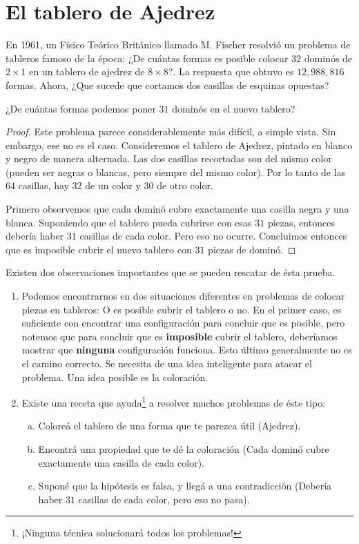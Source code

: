 \section{El tablero de Ajedrez}

En 1961, un F\'isico Te\'orico Brit\'anico llamado M. Fischer resolvi\'o un problema de tableros famoso de la \'epoca: ¿De cu\'antas formas es posible colocar $32$ domin\'os de $2\times 1$ en un tablero de ajedrez de $8\times 8$?. La respuesta que obtuvo es $12,988,816$ formas. 
Ahora, ¿Que sucede que cortamos dos casillas de esquinas opuestas?

\begin{ejem}
	 ¿De cu\'antas formas podemos poner $31$ domin\'os en el nuevo tablero?
\end{ejem}
\begin{proof}
	Este problema parece considerablemente m\'as dif\'icil, a simple vista. Sin embargo, ese no es el caso. Consideremos el tablero de Ajedrez, pintado en blanco y negro de manera alternada. Las dos casillas recortadas son del mismo color (pueden ser negras o blancas, pero siempre del mismo color). Por lo tanto de las $64$ casillas, hay $32$ de un color y $30$ de otro color. 
	
	Primero observemos que cada domin\'o cubre exactamente una casilla negra y una blanca. Suponiendo que el tablero pueda cubrirse con esas $31$ piezas, entonces deber\'ia haber $31$ casillas de cada color. Pero eso no ocurre. Concluimos entonces que es imposible cubrir el nuevo tablero con $31$ piezas de domin\'o. 
\end{proof}
 

Existen dos observaciones importantes que se pueden rescatar de \'esta prueba. 
\begin{enumerate}
	\item Podemos encontrarnos en dos situaciones diferentes en problemas de colocar piezas en tableros: O es posible cubrir el tablero o no. En el primer caso, es suficiente con encontrar una configuraci\'on para concluir que es posible, pero notemos que para concluir que es \textbf{imposible} cubrir el tablero, deber\'iamos mostrar que \textbf{ninguna} configuraci\'on funciona. Esto \'ultimo generalmente no es el camino correcto. Se necesita de una idea inteligente para atacar el problema. Una idea posible es la coloraci\'on.
	\item Existe una receta que ayuda\footnote{¡Ninguna t\'ecnica solucionar\'a todos los problemas!} a resolver muchos problemas de \'este tipo:
	\begin{enumerate}[a.]
		\item Colore\'a el tablero de una forma que te parezca \'util (Ajedrez). %
		\item Encontr\'a una propiedad que te d\'e la coloraci\'on (Cada domin\'o cubre exactamente una casilla de cada color). 
		\item Supon\'e que la hip\'otesis es falsa, y lleg\'a a una contradicci\'on (Deber\'ia haber $31$ casillas de cada color, pero eso no pasa).
	\end{enumerate}

	
	
\end{enumerate}

